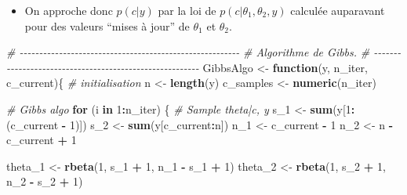 \documentclass[
]{article}
\newenvironment{Shaded}{\begin{snugshade}}{\end{snugshade}}
\newcommand{\CommentTok}[1]{\textcolor[rgb]{0.56,0.35,0.01}{\textit{#1}}}
\newcommand{\ControlFlowTok}[1]{\textcolor[rgb]{0.13,0.29,0.53}{\textbf{#1}}}
\newcommand{\DecValTok}[1]{\textcolor[rgb]{0.00,0.00,0.81}{#1}}
\newcommand{\FunctionTok}[1]{\textcolor[rgb]{0.13,0.29,0.53}{\textbf{#1}}}
\newcommand{\NormalTok}[1]{#1}
\newcommand{\OtherTok}[1]{\textcolor[rgb]{0.56,0.35,0.01}{#1}}
\newcommand{\SpecialCharTok}[1]{\textcolor[rgb]{0.81,0.36,0.00}{\textbf{#1}}}
\providecommand{\tightlist}{%
  \setlength{\itemsep}{0pt}\setlength{\parskip}{0pt}}
\begin{document}
\begin{itemize}
\tightlist
\item
  On approche donc \(p(c|y)\) par la loi de
  \(p(c|\theta_1, \theta_2, y)\) calculée auparavant pour des valeurs
  ``mises à jour'' de \(\theta_1\) et \(\theta_2\).
\end{itemize}

\begin{Shaded}
\begin{Highlighting}[]
\CommentTok{\# {-}{-}{-}{-}{-}{-}{-}{-}{-}{-}{-}{-}{-}{-}{-}{-}{-}{-}{-}{-}{-}{-}{-}{-}{-}{-}{-}{-}{-}{-}{-}{-}{-}{-}{-}{-}{-}{-}{-}{-}{-}{-}{-}{-}{-}{-}{-}{-}{-}{-}{-}{-}{-}{-}{-}{-}}
\CommentTok{\# Algorithme de Gibbs.}
\CommentTok{\# {-}{-}{-}{-}{-}{-}{-}{-}{-}{-}{-}{-}{-}{-}{-}{-}{-}{-}{-}{-}{-}{-}{-}{-}{-}{-}{-}{-}{-}{-}{-}{-}{-}{-}{-}{-}{-}{-}{-}{-}{-}{-}{-}{-}{-}{-}{-}{-}{-}{-}{-}{-}{-}{-}{-}{-}}
\NormalTok{GibbsAlgo }\OtherTok{\textless{}{-}} \ControlFlowTok{function}\NormalTok{(y, n\_iter, c\_current)\{}
  \CommentTok{\# initialisation}
\NormalTok{  n }\OtherTok{\textless{}{-}} \FunctionTok{length}\NormalTok{(y)}
\NormalTok{  c\_samples }\OtherTok{\textless{}{-}} \FunctionTok{numeric}\NormalTok{(n\_iter)}
  
  \CommentTok{\# Gibbs algo}
  \ControlFlowTok{for}\NormalTok{ (i }\ControlFlowTok{in} \DecValTok{1}\SpecialCharTok{:}\NormalTok{n\_iter) \{}
    \CommentTok{\# Sample theta|c, y}
\NormalTok{    s\_1 }\OtherTok{\textless{}{-}} \FunctionTok{sum}\NormalTok{(y[}\DecValTok{1}\SpecialCharTok{:}\NormalTok{(c\_current }\SpecialCharTok{{-}} \DecValTok{1}\NormalTok{)])}
\NormalTok{    s\_2 }\OtherTok{\textless{}{-}} \FunctionTok{sum}\NormalTok{(y[c\_current}\SpecialCharTok{:}\NormalTok{n])}
\NormalTok{    n\_1 }\OtherTok{\textless{}{-}}\NormalTok{ c\_current }\SpecialCharTok{{-}} \DecValTok{1}
\NormalTok{    n\_2 }\OtherTok{\textless{}{-}}\NormalTok{ n }\SpecialCharTok{{-}}\NormalTok{ c\_current }\SpecialCharTok{+} \DecValTok{1}
    
\NormalTok{    theta\_1 }\OtherTok{\textless{}{-}} \FunctionTok{rbeta}\NormalTok{(}\DecValTok{1}\NormalTok{, s\_1 }\SpecialCharTok{+} \DecValTok{1}\NormalTok{, n\_1 }\SpecialCharTok{{-}}\NormalTok{ s\_1 }\SpecialCharTok{+} \DecValTok{1}\NormalTok{)}
\NormalTok{    theta\_2 }\OtherTok{\textless{}{-}} \FunctionTok{rbeta}\NormalTok{(}\DecValTok{1}\NormalTok{, s\_2 }\SpecialCharTok{+} \DecValTok{1}\NormalTok{, n\_2 }\SpecialCharTok{{-}}\NormalTok{ s\_2 }\SpecialCharTok{+} \DecValTok{1}\NormalTok{)}
    

\end{Highlighting}
\end{Shaded}
\end{document}

